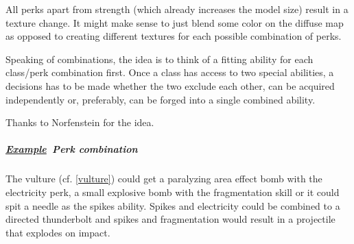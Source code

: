 \documentclass{scrartcl}
\newcommand{\example}  [0]{\textbf{\underline{Example}\ }}
\begin{document}
All perks apart from strength (which already increases the model size) result in a texture change. It might make sense to just blend some color on the diffuse map as opposed to creating different textures for each possible combination of perks.

Speaking of combinations, the idea is to think of a fitting ability for each class/perk combination first. Once a class has access to two special abilities, a decisions has to be made whether the two exclude each other, can be acquired independently or, preferably, can be forged into a single combined ability.

Thanks to Norfenstein for the idea.

\subparagraph{\example Perk combination}

The vulture (cf. \ref{vulture}) could get a paralyzing area effect bomb with the electricity perk, a small explosive bomb with the fragmentation skill or it could spit a needle as the spikes ability. Spikes and electricity could be combined to a directed thunderbolt and spikes and fragmentation would result in a projectile that explodes on impact.
\end{document}
